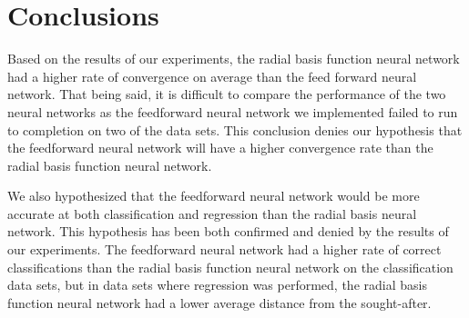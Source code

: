 \documentclass[twoside,11pt]{article}
\begin{document}
\begin{center}
\end{center}

\section{Conclusions}
Based on the results of our experiments, the radial basis function neural network had a higher rate of convergence on average than the feed forward neural network. That being said, it is difficult to compare the performance of the two neural networks as the feedforward neural network we implemented failed to run to completion on two of the data sets. This conclusion denies our hypothesis that the feedforward neural network will have a higher convergence rate than the radial basis function neural network.

We also hypothesized that the feedforward neural network would be more accurate at both classification and regression than the radial basis neural network. This hypothesis has been both confirmed and denied by the results of our experiments. The feedforward neural network had a higher rate of correct classifications than the radial basis function neural network on the classification data sets, but in data sets where regression was performed, the radial basis function neural network had a lower average distance from the sought-after.


\end{document}
